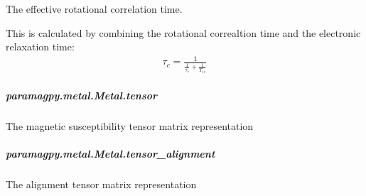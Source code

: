\documentclass[a4paper,10pt,english,openany,oneside]{sphinxmanual}
\begin{document}
\begin{fulllineitems}
\begin{fulllineitems}
\begin{fulllineitems}
\label{\detokenize{reference/generated/paramagpy.metal.Metal.tauc:paramagpy.metal.Metal.tauc}}
\sphinxAtStartPar
The effective rotational correlation time.

\sphinxAtStartPar
This is calculated by combining the rotational correaltion time
and the electronic relaxation time:
\begin{equation*}
\begin{split}\tau_c = \frac{1}{\frac{1}{\tau_r}+\frac{1}{T_{1e}}}\end{split}
\end{equation*}
\end{fulllineitems}



\subparagraph{paramagpy.metal.Metal.tensor}
\label{\detokenize{reference/generated/paramagpy.metal.Metal.tensor:paramagpy-metal-metal-tensor}}\label{\detokenize{reference/generated/paramagpy.metal.Metal.tensor::doc}}

\begin{fulllineitems}
\label{\detokenize{reference/generated/paramagpy.metal.Metal.tensor:paramagpy.metal.Metal.tensor}}
\sphinxAtStartPar
The magnetic susceptibility tensor matrix representation

\end{fulllineitems}



\subparagraph{paramagpy.metal.Metal.tensor\_alignment}
\label{\detokenize{reference/generated/paramagpy.metal.Metal.tensor_alignment:paramagpy-metal-metal-tensor-alignment}}\label{\detokenize{reference/generated/paramagpy.metal.Metal.tensor_alignment::doc}}

\begin{fulllineitems}
\label{\detokenize{reference/generated/paramagpy.metal.Metal.tensor_alignment:paramagpy.metal.Metal.tensor_alignment}}
\sphinxAtStartPar
The alignment tensor matrix representation


\end{fulllineitems}
\end{fulllineitems}
\end{fulllineitems}
\end{document}
